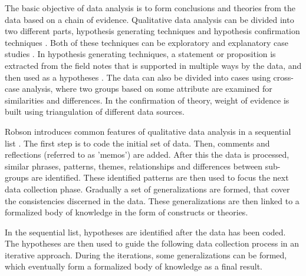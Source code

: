 \documentclass[english, grading]{tktltiki2}
\theoremstyle{definition}
\theoremstyle{remark}
\begin{document}
The basic objective of data analysis is to form conclusions and theories from the data based on a chain of evidence. Qualitative data analysis can be divided into two different parts, hypothesis generating techniques and hypothesis confirmation techniques \cite{runeson2009guidelines}. Both of these techniques can be exploratory and explanatory case studies \cite{runeson2009guidelines}. In hypothesis generating techniques, a statement or proposition is extracted from the field notes that is supported in multiple ways by the data, and then used as a hypotheses \cite{seaman1999qualitative}. The data can also be divided into cases using cross-case analysis, where two groups based on some attribute are examined for similarities and differences. In the confirmation of theory, weight of evidence is built using triangulation of different data sources. 

Robson introduces common features of qualitative data analysis in a sequential list \cite{robson2002real}. The first step is to code the initial set of data. Then, comments and reflections (referred to as 'memos') are added. After this the data is processed, similar phrases, patterns, themes, relationships and differences between sub-groups are identified. These identified patterns are then used to focus the next data collection phase. Gradually a set of generalizations are formed, that cover the consistencies discerned in the data. These generalizations are then linked to a formalized body of knowledge in the form of constructs or theories. 

In the sequential list, hypotheses are identified after the data has been coded. The hypotheses are then used to guide the following data collection process in an iterative approach. During the iterations, some generalizations can be formed, which eventually form a formalized body of knowledge as a final result.
\end{document}
